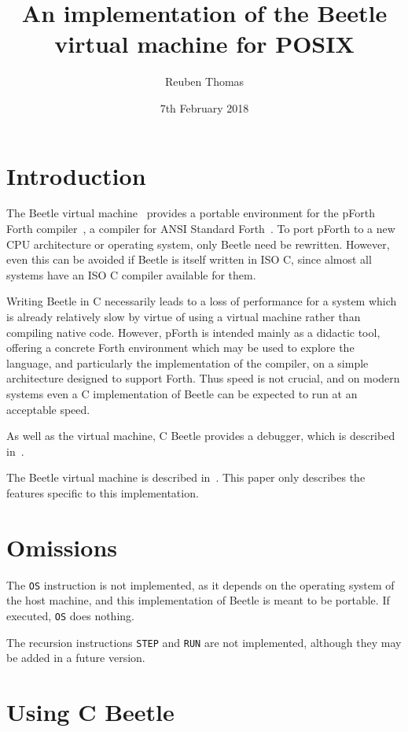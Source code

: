 \documentclass{article}
\title{An implementation of the Beetle virtual machine for POSIX}
\author{Reuben Thomas}
\date{7th February 2018}
\begin{document}
\maketitle


\section{Introduction}

The Beetle virtual machine~\cite{beetle} provides a portable environment
for the pForth Forth compiler~\cite{beetledis}, a compiler for ANSI Standard
Forth~\cite{ANSIforth}. To port pForth to a new CPU architecture or operating system, only Beetle need be rewritten. However, even this can be
avoided if Beetle is itself written in ISO C, since almost all systems have
an ISO C compiler available for them.

Writing Beetle in C necessarily leads to a loss of performance for a system
which is already relatively slow by virtue of using a virtual machine
rather than compiling native code. However, pForth is intended mainly as a
didactic tool, offering a concrete Forth environment which may be used to
explore the language, and particularly the implementation of the compiler, on
a simple architecture designed to support Forth. Thus speed is not crucial,
and on modern systems even a C implementation of Beetle can be expected to
run at an acceptable speed.

As well as the virtual machine, C Beetle provides a debugger, which is described in~\cite{beetleuiface}.

The Beetle virtual machine is described in~\cite{beetle}. This paper only
describes the features specific to this implementation.


\section{Omissions}

The {\tt OS} instruction is not implemented, as it depends on the operating
system of the host machine, and this implementation of Beetle is meant to be
portable. If executed, {\tt OS} does nothing.

The recursion instructions {\tt STEP} and {\tt RUN} are not implemented,
although they may be added in a future version.


\section{Using C Beetle}
\end{document}
